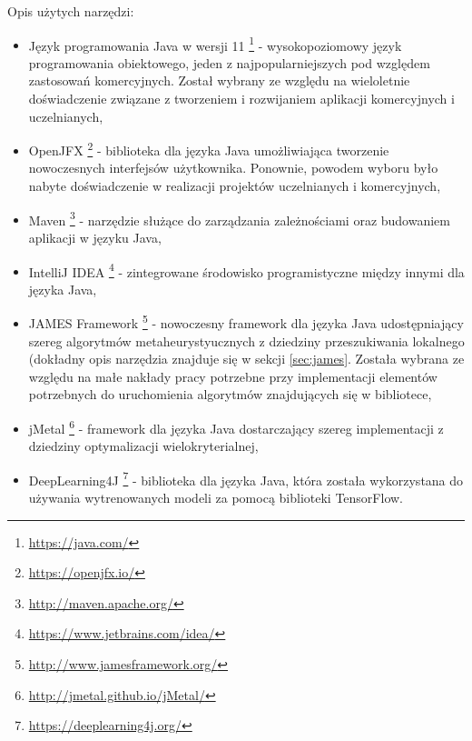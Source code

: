 Opis użytych narzędzi:
\begin{itemize}
    \item Język programowania Java w wersji 11 \footnote{\url{https://java.com/}} - wysokopoziomowy język programowania obiektowego, jeden z najpopularniejszych pod względem zastosowań komercyjnych. Został wybrany ze względu na wieloletnie doświadczenie związane z tworzeniem i rozwijaniem aplikacji komercyjnych i uczelnianych,
    \item OpenJFX \footnote{\url{https://openjfx.io/}} - biblioteka dla języka Java umożliwiająca tworzenie nowoczesnych interfejsów użytkownika. Ponownie, powodem wyboru było nabyte doświadczenie w realizacji projektów uczelnianych i komercyjnych,
    \item Maven \footnote{\url{http://maven.apache.org/}} - narzędzie służące do zarządzania zależnościami oraz budowaniem aplikacji w języku Java,
    \item IntelliJ IDEA \footnote{\url{https://www.jetbrains.com/idea/}} - zintegrowane środowisko programistyczne między innymi dla języka Java,
    \item JAMES Framework \footnote{\url{http://www.jamesframework.org/}} \cite{james} - nowoczesny framework dla języka Java udostępniający szereg algorytmów metaheurystyucznych z dziedziny przeszukiwania lokalnego (dokładny opis narzędzia znajduje się w sekcji \ref{sec:james}. Została wybrana ze względu na małe nakłady pracy potrzebne przy implementacji elementów potrzebnych do uruchomienia algorytmów znajdujących się w bibliotece,
    \item jMetal \footnote{\url{http://jmetal.github.io/jMetal/}} \cite{jmetal} - framework dla języka Java dostarczający szereg implementacji z dziedziny optymalizacji wielokryterialnej,
    \item DeepLearning4J \footnote{\url{https://deeplearning4j.org/}} - biblioteka dla języka Java, która została wykorzystana do używania wytrenowanych modeli za pomocą biblioteki TensorFlow.
\end{itemize}

